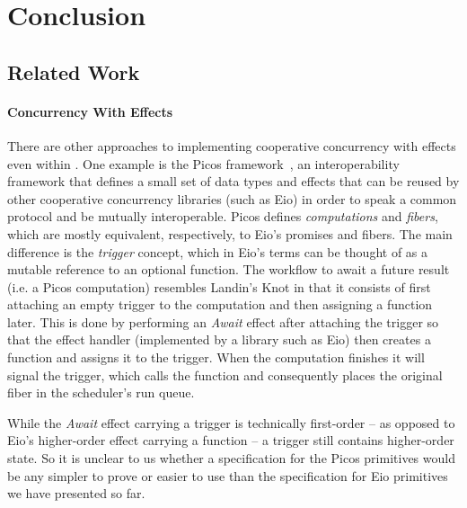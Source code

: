 \section{Conclusion}
\label{sec:conclusion}

\subsection{Related Work}
\paragraph*{Concurrency With Effects}
There are other approaches to implementing cooperative concurrency with effects even within \ocf{}.
One example is the Picos framework~\cite{Picos}, an interoperability framework that defines a small set of data types and effects that can be reused by other cooperative concurrency libraries (such as Eio)
in order to speak a common protocol and be mutually interoperable.
Picos defines \emph{computations} and \emph{fibers}, which are mostly equivalent, respectively, to Eio's promises and fibers.
The main difference is the \emph{trigger} concept, which in Eio's terms can be thought of as a mutable reference to an optional  function.
The workflow to await a future result (i.e. a Picos computation) resembles Landin's Knot in that it consists of first attaching an empty trigger to the computation and then assigning a  function later.
This is done by performing an \emph{Await} effect after attaching the trigger so that the effect handler (implemented by a library such as Eio) then creates a  function and assigns it to the trigger.
When the computation finishes it will signal the trigger, which calls the  function and consequently places the original fiber in the scheduler's run queue.

While the \emph{Await} effect carrying a trigger is technically first-order -- as opposed to Eio's higher-order \esuspend{} effect carrying a  function --
a trigger still contains higher-order state.
So it is unclear to us whether a specification for the Picos primitives would be any simpler to prove or easier to use than the specification for Eio primitives we have presented so far.

